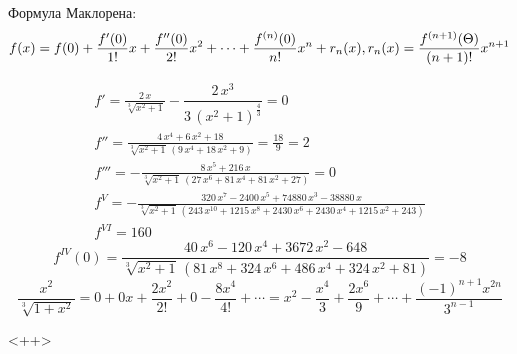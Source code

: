 \documentclass[../rgr_2.tex]{subfiles}
\begin{document}

	Формула Маклорена:
\begin{dmath}
	f(x) = f(0) + \frac{f'(0)}{1!}x + \frac{f''(0)}{2!}x^2 +\cdots+
	\frac{f^{(n)}(0)}{n!}x^n + r_n(x), \\
	r_n(x) = \frac{f^{(n+1)}(\Theta)}{(n+1)!}x^{n+1}
	\label{maclaurin}
\end{dmath}

\Solution

\begin{align}
	f' = \frac{2\,x}{\sqrt[{3}]{{x}^{2}+1}}-\dfrac{2\,{x}^{3}}{3\,\left({{x}^{2}+1}\right)^{\frac{4}{3}}} = 0 \\
	f'' =
		\frac{4\,{x}^{4}+6\,{x}^{2}+18}{\sqrt[{3}]{{x}^{2}+1}\,\left(9\,{x}^{4}+18\,{x}^{2}+9\right)} = \frac{18}{9} = 2
		\\
	f''' = -\frac{8\,{x}^{5}+216\,x}{\sqrt[{3}]{{x}^{2}+1}\,\left(27\,{x}^{6}+81\,{x}^{4}+81\,{x}^{2}+27\right)} = 0
		\\
	f^V =
		-\frac{320\,{x}^{7}-2400\,{x}^{5}+74880\,{x}^{3}-38880\,x}{\sqrt[{3}]{{x}^{2}+1}\,\left(243\,{x}^{10}+1215\,{x}^{8}+2430\,{x}^{6}+2430\,{x}^{4}+1215\,{x}^{2}+243\right)}
		\\
	f^{VI} =
		160
\end{align}
\begin{dmath}
	f^{IV}(0) =
	\frac{40\,{x}^{6}-120\,{x}^{4}+3672\,{x}^{2}-648}{\sqrt[{3}]{{x}^{2}+1}\,\left(81\,{x}^{8}+324\,{x}^{6}+486\,{x}^{4}+324\,{x}^{2}+81\right)}
	= -8
\end{dmath}
\begin{equation}
	\frac{x^2}{\sqrt[3]{1+x^2}}
	= 0+0x+\frac{2x^2}{2!}+0-\frac{8x^4}{4!} + \cdots
	= x^2-\frac{x^4}{3} %
		+ \frac{2x^6}{9}
		+ \cdots
		+ \frac{(-1)^{n+1}x^{2n}}{3^{n-1}}
\end{equation}

<++>



\end{document}

